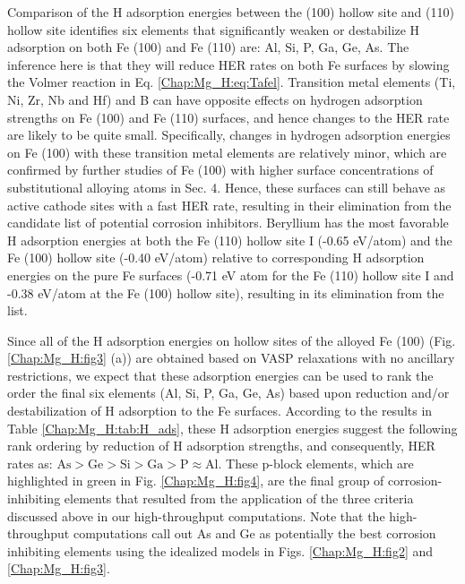 Comparison of the H adsorption energies between the (100) hollow site and (110) hollow site identifies six elements that significantly weaken or destabilize H adsorption on both Fe (100) and Fe (110) are: Al, Si, P, Ga, Ge, As. The inference here is that they will reduce \ac{HER} rates on both Fe surfaces by slowing the Volmer reaction in Eq. \ref{Chap:Mg_H:eq:Tafel}. Transition metal elements (Ti, Ni, Zr, Nb and Hf) and B can have opposite effects on hydrogen adsorption strengths on Fe (100) and Fe (110) surfaces, and hence changes to the \ac{HER} rate are likely to be quite small. Specifically, changes in hydrogen adsorption energies on Fe (100) with these transition metal elements are relatively minor, which are confirmed by further studies of Fe (100) with higher surface concentrations of substitutional alloying atoms in Sec. 4. Hence, these surfaces can still behave as active cathode sites with a fast \ac{HER} rate, resulting in their elimination from the candidate list of potential corrosion inhibitors. Beryllium has the most favorable H adsorption energies at both the Fe (110) hollow site I (-0.65 eV/atom) and the Fe (100) hollow site (-0.40 eV/atom) relative to corresponding H adsorption energies on the pure Fe surfaces (-0.71 eV atom for the Fe (110) hollow site I and -0.38 eV/atom at the Fe (100) hollow site), resulting in its elimination from the list.


Since all of the H adsorption energies on hollow sites of the alloyed Fe (100) (Fig. \ref{Chap:Mg_H:fig3} (a)) are obtained based on VASP relaxations with no ancillary restrictions, we expect that these adsorption energies can be used to rank the order the final six elements (Al, Si, P, Ga, Ge, As) based upon reduction and/or destabilization of H adsorption to the Fe surfaces. According to the results in Table \ref{Chap:Mg_H:tab:H_ads}, these H adsorption energies suggest the following rank ordering by reduction of H adsorption strengths, and consequently, HER rates as: $\text{As} > \text{Ge} > \text{Si} > \text{Ga} > \text{P} \approx \text{Al}$. These p-block elements, which are highlighted in green in Fig. \ref{Chap:Mg_H:fig4}, are the final group of corrosion-inhibiting elements that resulted from the application of the three criteria discussed above in our high-throughput computations. Note that the high-throughput computations call out As and Ge as potentially the best corrosion inhibiting elements using the idealized models in Figs. \ref{Chap:Mg_H:fig2} and \ref{Chap:Mg_H:fig3}.


